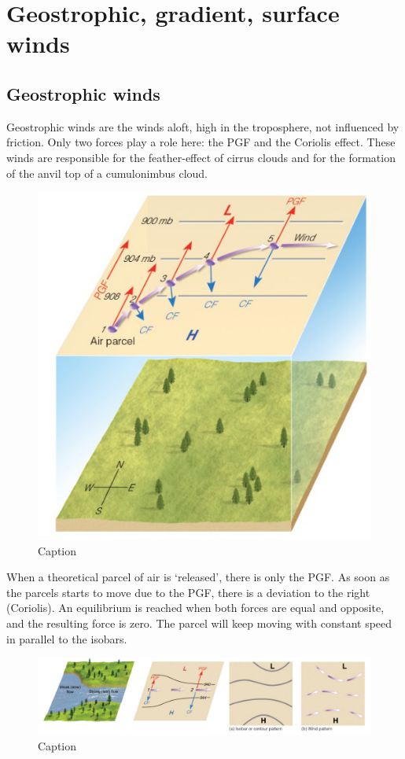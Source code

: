 \documentclass[oneside]{book}
\begin{document}
\section{Geostrophic, gradient, surface
winds}\label{geostrophic-gradient-surface-winds}

\subsection{Geostrophic winds}\label{geostrophic-winds}

Geostrophic winds are the winds aloft, high in the troposphere, not
influenced by friction. Only two forces play a role here: the PGF and
the Coriolis effect. These winds are responsible for the feather-effect
of cirrus clouds and for the formation of the anvil top of a
cumulonimbus cloud.

\begin{figure}

{\centering \includegraphics[width=0.4\linewidth]{figures/Figure48} 

}

\caption{Caption}\label{fig:Geos}
\end{figure}

When a theoretical parcel of air is `released', there is only the PGF.
As soon as the parcels starts to move due to the PGF, there is a
deviation to the right (Coriolis). An equilibrium is reached when both
forces are equal and opposite, and the resulting force is zero. The
parcel will keep moving with constant speed in parallel to the isobars.

\begin{figure}

{\centering \includegraphics[width=0.4\linewidth]{figures/Figure49} 

}

\caption{Caption}\label{fig:PGF}
\end{figure}
\end{document}
